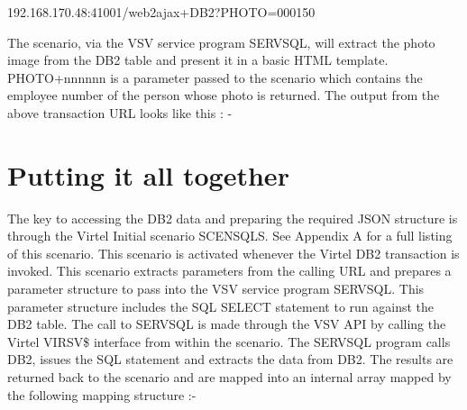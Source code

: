 \documentclass[letterpaper,10pt,english]{sphinxmanual}
\begin{document}
\begin{sphinxVerbatim}[commandchars=\\\{\}]
192.168.170.48:41001/web2ajax+DB2?PHOTO=000150
\end{sphinxVerbatim}

The scenario, via the VSV service program SERVSQL, will extract the photo image from the DB2 table and present it in a basic HTML template. PHOTO+nnnnnn is a parameter passed to the scenario which contains the employee number of the person whose photo is returned. The output from the above transaction URL looks like this : -



\section{Putting it all together}
\label{\detokenize{TN201906:putting-it-all-together}}
The key to accessing the DB2 data and preparing the required JSON structure is through the Virtel Initial scenario SCENSQLS. See Appendix A for a full listing of this scenario. This scenario is activated whenever the Virtel DB2 transaction is invoked. This scenario extracts parameters from the calling URL and prepares a parameter structure to pass into the VSV service program SERVSQL. This parameter structure includes the SQL SELECT statement to run against the DB2 table. The call to SERVSQL is made through the VSV API by calling the Virtel VIRSV\$ interface from within the scenario. The SERVSQL program  calls DB2, issues the SQL statement and extracts the data from DB2. The results are returned back to the scenario and are mapped into an internal array mapped by the following mapping structure :-
\end{document}

